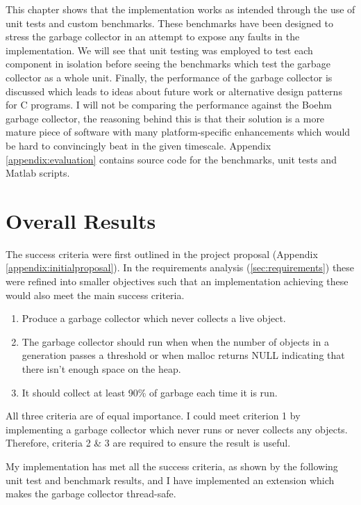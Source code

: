 \documentclass[../diss.tex]{subfiles}
\begin{document}
This chapter shows that the implementation works as intended through the use of unit tests and custom benchmarks. These benchmarks have been designed to stress the garbage collector in an attempt to expose any faults in the implementation. We will see that unit testing was employed to test each component in isolation before seeing the benchmarks which test the garbage collector as a whole unit. Finally, the performance of the garbage collector is discussed which leads to ideas about future work or alternative design patterns for C programs. I will not be comparing the performance against the Boehm garbage collector, the reasoning behind this is that their solution is a more mature piece of software with many platform-specific enhancements which would be hard to convincingly beat in the given timescale. Appendix \ref{appendix:evaluation} contains source code for the benchmarks, unit tests and Matlab scripts.

\section{Overall Results} \label{sec:overallresults}


The success criteria were first outlined in the project proposal (Appendix \ref{appendix:initialproposal}). In the requirements analysis (\cref{sec:requirements}) these were refined into smaller objectives such that an implementation achieving these would also meet the main success criteria.

\begin{enumerate}
    \item Produce a garbage collector which never collects a live object.
    \item The garbage collector should run when when the number of objects in a generation passes a threshold or when malloc returns NULL indicating that there isn't enough space on the heap.
    \item  It should collect at least 90\% of garbage each time it is run.
\end{enumerate}
 
All three criteria are of equal importance. I could meet criterion 1 by implementing a garbage collector which never runs or never collects any objects. Therefore, criteria 2 \& 3 are required to ensure the result is useful.

My implementation has met all the success criteria, as shown by the following unit test and benchmark results, and I have implemented an extension which makes the garbage collector thread-safe.
\end{document}
